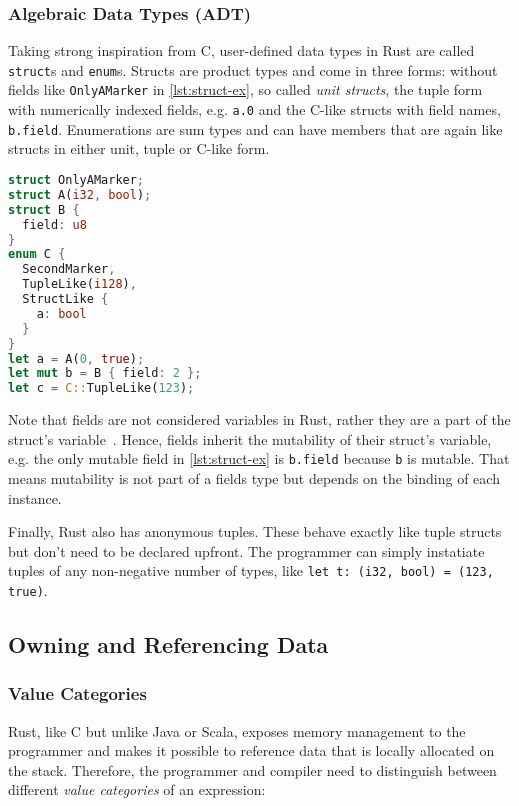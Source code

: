 \subsubsection{Algebraic Data Types (ADT)}

Taking strong inspiration from C, user-defined data types in Rust are called
\lstinline!struct!s and \lstinline!enum!s. Structs are product types and come in
three forms: without fields like \lstinline!OnlyAMarker! in
\autoref{lst:struct-ex}, so called \emph{unit structs}, the tuple form with
numerically indexed fields, e.g. \lstinline!a.0! and the C-like structs with
field names, \lstinline!b.field!. Enumerations are sum types and can have
members that are again like structs in either unit, tuple or C-like form.

\begin{lstlisting}[language=Rust, caption={ADTs an instances thereof.}, label=lst:struct-ex]
struct OnlyAMarker;
struct A(i32, bool);
struct B {
  field: u8
}
enum C {
  SecondMarker,
  TupleLike(i128),
  StructLike {
    a: bool
  }
}
let a = A(0, true);
let mut b = B { field: 2 };
let c = C::TupleLike(123);
\end{lstlisting}

Note that fields are not considered variables in Rust, rather they are a part of
the struct's variable~\cite{rustref}. Hence, fields inherit the mutability of
their struct's variable, e.g. the only mutable field in \autoref{lst:struct-ex}
is \lstinline!b.field! because \lstinline!b! is mutable. That means mutability
is not part of a fields type but depends on the binding of each instance.

Finally, Rust also has anonymous tuples. These behave exactly like tuple structs
but don't need to be declared upfront. The programmer can simply instatiate
tuples of any non-negative number of types, like
\lstinline!let t: (i32, bool) = (123, true)!.


\iffalse
  - pattern match
  - impls
  - traits
  - generics
\fi


\subsection{Owning and Referencing Data}

\subsubsection{Value Categories}

Rust, like C but unlike Java or Scala, exposes memory management to the
programmer and makes it possible to reference data that is locally allocated on
the stack. Therefore, the programmer and compiler need  to distinguish between
different \emph{value categories} of an expression:

